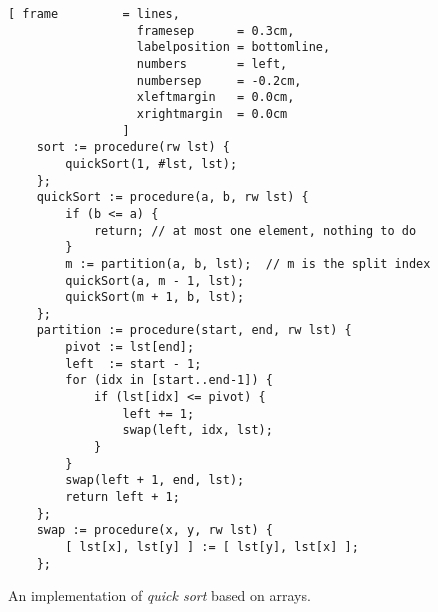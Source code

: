 \begin{figure}[!ht]
  \centering
\begin{Verbatim}[ frame         = lines, 
                  framesep      = 0.3cm, 
                  labelposition = bottomline,
                  numbers       = left,
                  numbersep     = -0.2cm,
                  xleftmargin   = 0.0cm,
                  xrightmargin  = 0.0cm
                ]
    sort := procedure(rw lst) {
        quickSort(1, #lst, lst);
    };
    quickSort := procedure(a, b, rw lst) {
        if (b <= a) {
            return; // at most one element, nothing to do
        }
        m := partition(a, b, lst);  // m is the split index
        quickSort(a, m - 1, lst);
        quickSort(m + 1, b, lst);
    };
    partition := procedure(start, end, rw lst) {
        pivot := lst[end];
        left  := start - 1;
        for (idx in [start..end-1]) {
            if (lst[idx] <= pivot) {
                left += 1;
                swap(left, idx, lst);
            }
        }
        swap(left + 1, end, lst);
        return left + 1;
    };    
    swap := procedure(x, y, rw lst) {
        [ lst[x], lst[y] ] := [ lst[y], lst[x] ];
    };
\end{Verbatim}
\vspace*{-0.3cm}
  \caption{An implementation of \emph{quick sort} based on arrays.}
  \label{fig:quick-sort-array.stlx}
\end{figure}

